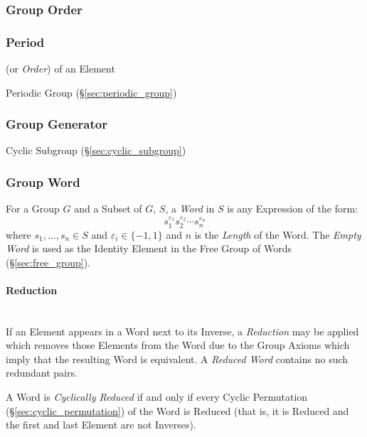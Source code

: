 \subsubsection{Group Order}\label{sec:group_order}

\subsubsection{Period}\label{sec:period}

(or \emph{Order}) of an Element

Periodic Group (\S\ref{sec:periodic_group})



\subsubsection{Group Generator}\label{sec:group_generator}

Cyclic Subgroup (\S\ref{sec:cyclic_subgroup})



\subsubsection{Group Word}\label{sec:group_word}

For a Group $G$ and a Subset of $G$, $S$, a \emph{Word} in $S$ is any
Expression of the form:
\[
    s_1^{\varepsilon_1}s_2^{\varepsilon_2} \cdots s_n^{\varepsilon_n}
\]
where $s_1,\ldots,s_n \in S$ and $\varepsilon_i \in \{-1, 1\}$ and $n$
is the \emph{Length} of the Word. The \emph{Empty Word} is used as the
Identity Element in the Free Group of Words (\S\ref{sec:free_group}).



\paragraph{Reduction}\label{sec:word_reduction}
\hfill \\

If an Element appears in a Word next to its Inverse, a
\emph{Reduction} may be applied which removes those Elements from the
Word due to the Group Axioms which imply that the resulting Word is
equivalent. A \emph{Reduced Word} contains no such redundant pairs.

A Word is \emph{Cyclically Reduced} if and only if every Cyclic
Permutation (\S\ref{sec:cyclic_permutation}) of the Word is Reduced
(that is, it is Reduced and the first and last Element are not
Inverses).



